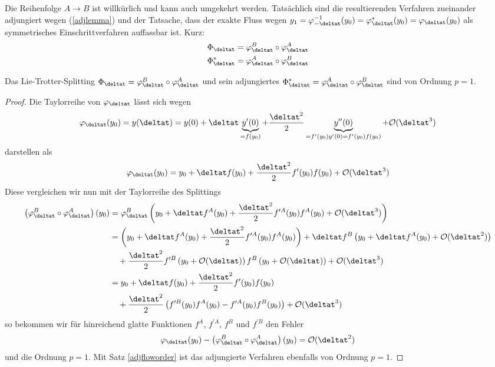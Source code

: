 \hfill%
\begin{minipage}{0.7\textwidth}
Die Reihenfolge $A\to B$ ist willkürlich und kann auch umgekehrt werden. Tatsächlich sind die resultierenden Verfahren zueinander adjungiert wegen (\ref{adjlemma}) und der Tatsache, dass der exakte Fluss wegen $y_1=\varphi_{-\deltat}^{-1}(y_0)=\varphi_{\deltat}^*(y_0)=\varphi_{\deltat}(y_0)$ als symmetrisches Einschrittverfahren auffassbar ist. Kurz:\\
\begin{align}
\label{liesplittings}
\Phi_{\deltat}=\varphi_{\deltat}^B \circ \varphi_{\deltat}^A\\
\Phi_{\deltat}^*=\varphi_{\deltat}^A \circ \varphi_{\deltat}^B\nonumber
\end{align} 
\end{minipage}

\begin{maththeorem}
\label{lieorder1}
Das Lie-Trotter-Splitting $\Phi_{\deltat}=\varphi_{\deltat}^B \circ \varphi_{\deltat}^A$ und sein adjungiertes $\Phi_{\deltat}^*=\varphi_{\deltat}^A \circ \varphi_{\deltat}^B$ sind von Ordnung $p=1$.
\end{maththeorem}
\begin{proof}
Die Taylorreihe von $\varphi_{\deltat}$ lässt sich wegen 
\[\varphi_{\deltat}(y_0)=y(\deltat)=y(0)+\deltat \underbrace{y^\prime(0)}_{=f(y_0)}
+\frac{\deltat^2}{2}\underbrace{y^{\prime\prime}(0)}_{=f^\prime(y_0)y^\prime(0)=f^\prime(y_0)f(y_0)}+\mathcal{O}(\deltat^3)\] darstellen als 
\[\varphi_{\deltat}(y_0)=y_0+\deltat f(y_0)+\frac{\deltat^2}{2}f^\prime(y_0)f(y_0)+\mathcal{O}(\deltat^3)\]
Diese vergleichen wir nun mit der Taylorreihe des Splittings
\begin{align*}
\left(\varphi_{\deltat}^B \circ \varphi_{\deltat}^A\right)(y_0)&=
\varphi_{\deltat}^B\left(y_0+\deltat f^A(y_0)+\frac{\deltat^2}{2}f^{\prime A}(y_0)f^A(y_0)+\mathcal{O}(\deltat^3)\right)\\
&=\left(y_0+\deltat f^A(y_0)+\frac{\deltat^2}{2}f^{\prime A}(y_0)f^A(y_0)\right)
+\deltat f^B\left(y_0+\deltat f^A(y_0)+\mathcal{O}(\deltat^2)\right)\\
&\quad+\frac{\deltat^2}{2}f^{\prime B}\left(y_0+\mathcal{O}(\deltat)\right)f^B\left(y_0+\mathcal{O}(\deltat)\right)+\mathcal{O}(\deltat^3)\\
&=y_0+\deltat f(y_0)+\frac{\deltat^2}{2}f^\prime(y_0)f(y_0)\\
&\quad+\frac{\deltat^2}{2}\left(f^{\prime B}(y_0)f^A(y_0)-f^{\prime A}(y_0)f^B(y_0)\right)+\mathcal{O}(\deltat^3)
\end{align*}
so bekommen wir für hinreichend glatte Funktionen $f^A$, $f^{\prime A}$, $f^B$ und $f^{\prime B}$ den Fehler \[\varphi_{\deltat}(y_0)-\left(\varphi_{\deltat}^B \circ \varphi_{\deltat}^A\right)(y_0)=\mathcal{O}(\deltat^2)\] und die Ordnung $p=1$. Mit Satz \ref{adjfloworder} ist das adjungierte Verfahren ebenfalls von Ordnung $p=1$.
\end{proof}

